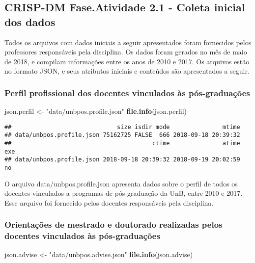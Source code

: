 \documentclass[]{article}
\newenvironment{Shaded}{\begin{snugshade}}{\end{snugshade}}
\newcommand{\KeywordTok}[1]{\textcolor[rgb]{0.13,0.29,0.53}{\textbf{#1}}}
\newcommand{\StringTok}[1]{\textcolor[rgb]{0.31,0.60,0.02}{#1}}
\newcommand{\NormalTok}[1]{#1}
\begin{document}
\subsection{CRISP-DM Fase.Atividade 2.1 - Coleta inicial dos
dados}\label{crisp-dm-fase.atividade-2.1---coleta-inicial-dos-dados}

Todos os arquivos com dados iniciais a seguir apresentados foram
fornecidos pelos professores responsáveis pela disciplina. Os dados
foram gerados no mês de maio de 2018, e compilam informações entre os
anos de 2010 e 2017. Os arquivos estão no formato JSON, e seus atributos
iniciais e conteúdos são apresentados a seguir.

\subsubsection{Perfil profissional dos docentes vinculados às
pós-graduações}\label{perfil-profissional-dos-docentes-vinculados-as-pos-graduacoes}

\begin{Shaded}
\begin{Highlighting}[]
\NormalTok{json.perfil <-}\StringTok{ "data/unbpos.profile.json"}
\KeywordTok{file.info}\NormalTok{(json.perfil)}
\end{Highlighting}
\end{Shaded}

\begin{verbatim}
##                              size isdir mode               mtime
## data/unbpos.profile.json 75162725 FALSE  666 2018-09-18 20:39:32
##                                        ctime               atime exe
## data/unbpos.profile.json 2018-09-18 20:39:32 2018-09-19 20:02:59  no
\end{verbatim}

O arquivo data/unbpos.profile.json apresenta dados sobre o perfil de
todos os docentes vinculados a programas de pós-graduação da UnB, entre
2010 e 2017. Esse arquivo foi fornecido pelos docentes responsáveis pela
disciplina.

\subsubsection{Orientações de mestrado e doutorado realizadas pelos
docentes vinculados às
pós-graduações}\label{orientacoes-de-mestrado-e-doutorado-realizadas-pelos-docentes-vinculados-as-pos-graduacoes}

\begin{Shaded}
\begin{Highlighting}[]
\NormalTok{json.advise <-}\StringTok{ "data/unbpos.advise.json"}
\KeywordTok{file.info}\NormalTok{(json.advise)}
\end{Highlighting}
\end{Shaded}
\end{document}
